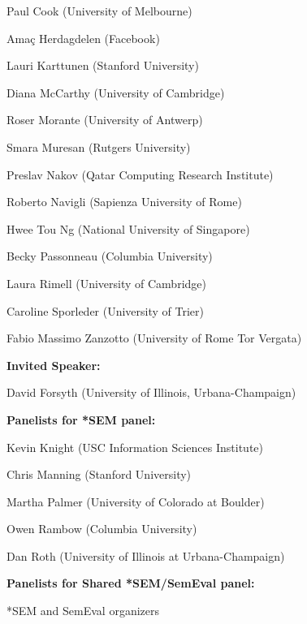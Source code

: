 \begin{description}
\begin{description}
    Paul Cook (University of Melbourne)

    Amaç Herdagdelen (Facebook)

    Lauri Karttunen (Stanford University)

    Diana McCarthy (University of Cambridge)

    Roser Morante (University of Antwerp)

    Smara Muresan (Rutgers University)

    Preslav Nakov (Qatar Computing Research Institute)

    Roberto Navigli (Sapienza University of Rome)

    Hwee Tou Ng (National University of Singapore)

    Becky Passonneau (Columbia University)

    Laura Rimell (University of Cambridge)

    Caroline Sporleder (University of Trier)

    Fabio Massimo Zanzotto (University of Rome Tor Vergata)

\end{description}


%

\vspace{3mm}
\item{\bf Invited Speaker:}  %

David Forsyth (University of Illinois, Urbana-Champaign)


\item{\bf Panelists for *SEM panel: }

Kevin Knight (USC \/ Information Sciences Institute)

Chris Manning (Stanford University)

Martha Palmer (University of Colorado at Boulder)

Owen Rambow (Columbia University)

Dan Roth (University of Illinois at Urbana-Champaign)


\item{\bf Panelists for Shared *SEM/SemEval panel:  }

*SEM and SemEval organizers

\end{description}

